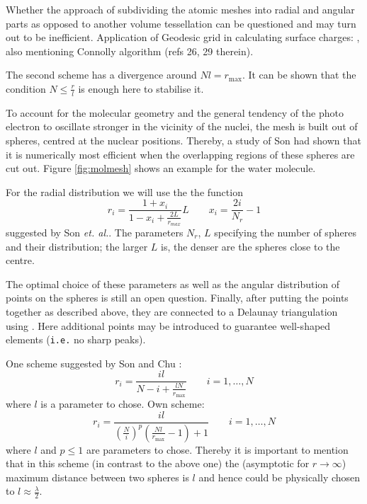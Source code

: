 Whether the approach of subdividing the atomic meshes into radial and angular parts as opposed to another volume tessellation can be questioned and 
may turn out to be inefficient.
Application of Geodesic grid in calculating surface charges: \cite{geodes_charge}, also mentioning Connolly algorithm (refs 26, 29 therein).

The second scheme has a divergence around $Nl=r_\text{max}$. 
It can be shown that the condition $N\leq \frac rl $ is enough here to stabilise it.


To account for the molecular geometry and the general tendency of the photo electron to oscillate stronger in the vicinity of the nuclei, the mesh is built out of spheres, centred at the nuclear positions.
Thereby, a study of Son \cite{Son_Chu0} had shown that it is numerically most efficient when the overlapping regions of these spheres are cut out.
Figure \ref{fig:molmesh} shows an example for the water molecule.

For the radial distribution we will use the the function
\[
r_i = \frac{1+x_i}{1-x_i+\frac{2L}{r_{max}}} L \qquad x_i = \frac{2i}{N_r} -1
\]
suggested by Son \textit{et. al.}\cite{Son_Chu0, Son_Chu}.
The parameters $N_r$, $L$ specifying the number of spheres and their distribution; the larger $L$ is, the denser are the spheres close to the centre.

The optimal choice of these parameters as well as the angular distribution of points on the spheres is still an open question.
Finally, after putting the points together as described above, they are connected to a Delaunay triangulation using  \cite{tetgen}. 
Here additional points may be introduced to guarantee well-shaped elements (\texttt{i.e.} no sharp peaks).

One scheme suggested by Son and Chu \cite{Son_Chu0}:
\[ r_i=\frac{il}{N-i+\frac{lN}{r_\text{max}}} \qquad i=1,\hdots ,N \]
where $l$ is a parameter to chose.
Own scheme:
\[ r_i=\frac{il}{\left( \frac Ni \right)^p \left(\frac{Nl}{r_\text{max}}-1\right) +1} \qquad i=1,\hdots ,N \]
where $l$ and $p\leq 1$ are parameters to chose. Thereby it is important to mention that in this scheme (in contrast to the above one) the (asymptotic for $r\rightarrow \infty$) maximum distance between two spheres is $l$ and hence could be physically chosen to $l\approx \frac \lambda 2$.

